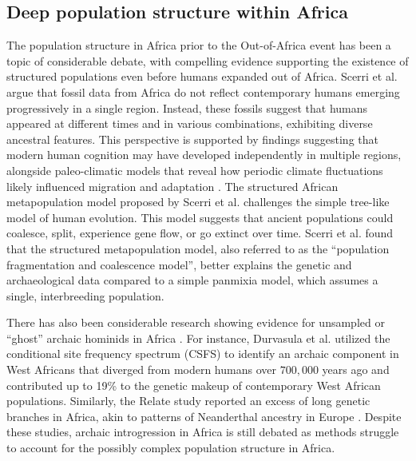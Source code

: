\subsection{Deep population structure within Africa}
\label{sec:ch3-deep-population-structure}

The population structure in Africa prior to the Out-of-Africa event has been a topic of considerable debate, with compelling evidence supporting the existence of structured populations even before humans expanded out of Africa.
%
Scerri et al. \cite{scerri2019beyond} argue that fossil data from Africa do not reflect contemporary humans emerging progressively in a single region. Instead, these fossils suggest that humans appeared at different times and in various combinations, exhibiting diverse ancestral features. This perspective is supported by findings suggesting that modern human cognition may have developed independently in multiple regions, alongside paleo-climatic models that reveal how periodic climate fluctuations likely influenced migration and adaptation \cite{mcbrearty2000revolution,demenocal2011climate}.
%
The structured African metapopulation model proposed by Scerri et al. challenges the simple tree-like model of human evolution. This model suggests that ancient populations could coalesce, split, experience gene flow, or go extinct over time. Scerri et al. found that the structured metapopulation model, also referred to as the ``population fragmentation and coalescence model'', better explains the genetic and archaeological data compared to a simple panmixia model, which assumes a single, interbreeding population.

There has also been considerable research showing evidence for unsampled or ``ghost'' archaic hominids in Africa \cite{skoglund2017reconstructing,ragsdale2019models,hammer2011genetic,lorente2019whole,durvasula2020recovering}. For instance, Durvasula et al. utilized the conditional site frequency spectrum (CSFS) to identify an archaic component in West Africans that diverged from modern humans over $700{,}000$ years ago and contributed up to 19\% to the genetic makeup of contemporary West African populations. Similarly, the Relate study reported an excess of long genetic branches in Africa, akin to patterns of Neanderthal ancestry in Europe \cite{speidel2019method}. Despite these studies, archaic introgression in Africa is still debated as methods struggle to account for the possibly complex population structure in Africa.
%

